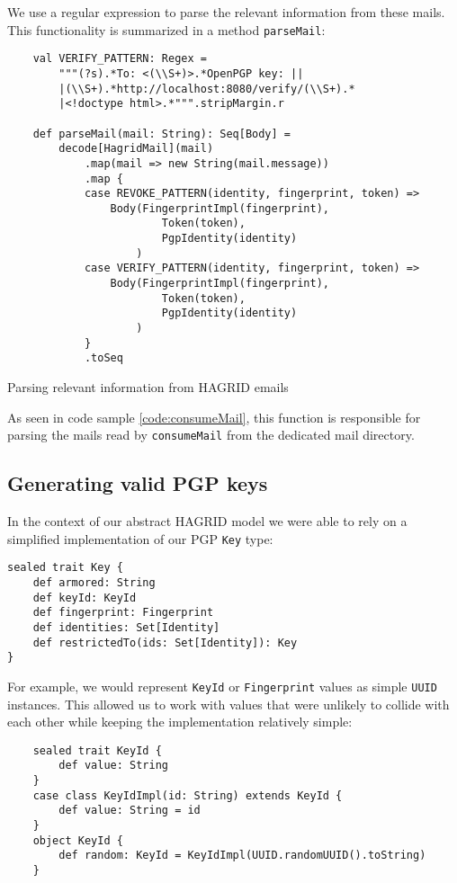We use a regular expression to parse the relevant information from these mails. This functionality is summarized in a method \texttt{parseMail}:
\begin{code}
    \begin{verbatim}
    val VERIFY_PATTERN: Regex = 
        """(?s).*To: <(\\S+)>.*OpenPGP key: ||
        |(\\S+).*http://localhost:8080/verify/(\\S+).*
        |<!doctype html>.*""".stripMargin.r

    def parseMail(mail: String): Seq[Body] =
        decode[HagridMail](mail)
            .map(mail => new String(mail.message))
            .map {
            case REVOKE_PATTERN(identity, fingerprint, token) => 
                Body(FingerprintImpl(fingerprint), 
                        Token(token), 
                        PgpIdentity(identity)
                    )
            case VERIFY_PATTERN(identity, fingerprint, token) => 
                Body(FingerprintImpl(fingerprint), 
                        Token(token), 
                        PgpIdentity(identity)
                    )
            }
            .toSeq
    \end{verbatim}
    \caption{Parsing relevant information from HAGRID emails}
\end{code}

As seen in code sample \ref{code:consumeMail}, this function is responsible for parsing the mails read by \texttt{consumeMail} from the dedicated mail directory.

\subsection{Generating valid PGP keys}
In the context of our abstract HAGRID model we were able to rely on a simplified implementation of our PGP \texttt{Key} type: 
\begin{verbatim}
sealed trait Key {
    def armored: String
    def keyId: KeyId
    def fingerprint: Fingerprint
    def identities: Set[Identity]
    def restrictedTo(ids: Set[Identity]): Key
}
\end{verbatim} 
For example, we would represent \texttt{KeyId} or \texttt{Fingerprint} values as simple \texttt{UUID} instances. This allowed us to work with values that were unlikely to collide with each other while keeping the implementation relatively simple:
\begin{verbatim}
    sealed trait KeyId {
        def value: String
    }
    case class KeyIdImpl(id: String) extends KeyId {
        def value: String = id
    }
    object KeyId {
        def random: KeyId = KeyIdImpl(UUID.randomUUID().toString)
    }
\end{verbatim}

